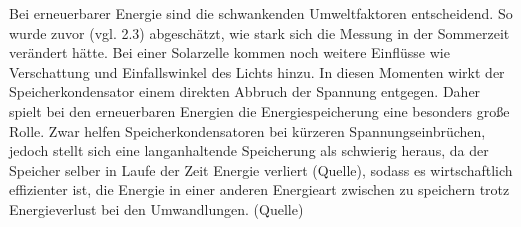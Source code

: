 \documentclass{etit-workshop-protokoll}
\begin{document}
        
        
        
        \par Bei erneuerbarer Energie sind die schwankenden Umweltfaktoren entscheidend. So wurde zuvor (vgl. 2.3) abgeschätzt, wie stark sich die Messung in der Sommerzeit verändert hätte. Bei einer Solarzelle kommen noch weitere Einflüsse wie Verschattung und Einfallswinkel des Lichts hinzu. In diesen Momenten wirkt der Speicherkondensator einem direkten Abbruch der Spannung entgegen. Daher spielt bei den erneuerbaren Energien die Energiespeicherung eine besonders große Rolle. Zwar helfen Speicherkondensatoren bei kürzeren Spannungseinbrüchen, jedoch stellt sich eine langanhaltende Speicherung als schwierig heraus, da der Speicher selber in Laufe der Zeit Energie verliert (Quelle), sodass es wirtschaftlich effizienter ist, die Energie in einer anderen Energieart zwischen zu speichern trotz Energieverlust bei den Umwandlungen. (Quelle) 



\clearpage %

\end{document}
